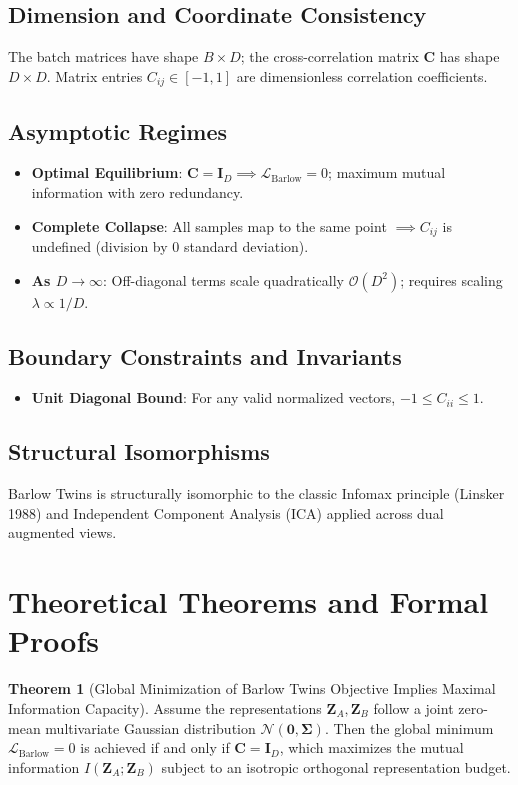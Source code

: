 \documentclass[11pt,a4paper]{article}
\theoremstyle{definition}
\newtheorem{theorem}{\textbf{Theorem}}[section]
\begin{document}
\subsection{Dimension and Coordinate Consistency}
The batch matrices have shape $B \times D$; the cross-correlation matrix $\mathbf{C}$ has shape $D \times D$. Matrix entries $C_{ij} \in [-1, 1]$ are dimensionless correlation coefficients.

\subsection{Asymptotic Regimes}
\begin{itemize}
    \item \textbf{Optimal Equilibrium}: $\mathbf{C} = \mathbf{I}_D \implies \mathcal{L}_{\text{Barlow}} = 0$; maximum mutual information with zero redundancy.
    \item \textbf{Complete Collapse}: All samples map to the same point $\implies C_{ij}$ is undefined (division by 0 standard deviation).
    \item \textbf{As $D \to \infty$}: Off-diagonal terms scale quadratically $\mathcal{O}(D^2)$; requires scaling $\lambda \propto 1/D$.
\end{itemize}

\subsection{Boundary Constraints and Invariants}
\begin{itemize}
    \item \textbf{Unit Diagonal Bound}: For any valid normalized vectors, $-1 \le C_{ii} \le 1$.
\end{itemize}

\subsection{Structural Isomorphisms}
Barlow Twins is structurally isomorphic to the classic Infomax principle (Linsker 1988) and Independent Component Analysis (ICA) applied across dual augmented views.

\section{Theoretical Theorems and Formal Proofs}

\begin{theorem}[Global Minimization of Barlow Twins Objective Implies Maximal Information Capacity]
Assume the representations $\mathbf{Z}_A, \mathbf{Z}_B$ follow a joint zero-mean multivariate Gaussian distribution $\mathcal{N}(\mathbf{0}, \mathbf{\Sigma})$. Then the global minimum $\mathcal{L}_{\text{Barlow}} = 0$ is achieved if and only if $\mathbf{C} = \mathbf{I}_D$, which maximizes the mutual information $I(\mathbf{Z}_A; \mathbf{Z}_B)$ subject to an isotropic orthogonal representation budget.
\end{theorem}
\end{document}
